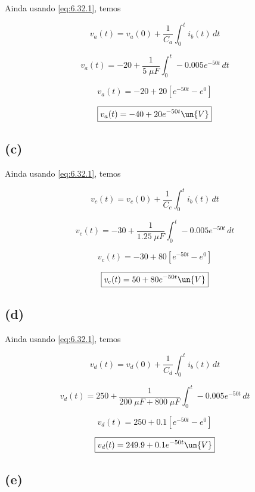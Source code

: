 Ainda usando \eqref{eq:6.32.1}, temos 

\[ v_a(t) = v_a(0) + \frac{1}{C_{a}} \int_{0}^{t} i_b(t) \,dt \]

\[ v_a(t) = -20 + \frac{1}{5 \;\mu F} \int_{0}^{t} -0.005e^{-50t} \,dt \]

\[ v_a(t) = -20 + 20 \left[e^{-50t} - e^0\right] \]

\[ \boxed{v_a(t) = -40 + 20e^{-50t} \un{V}}  \]

\subsection*{(c)}

Ainda usando \eqref{eq:6.32.1}, temos 

\[ v_c(t) = v_c(0) + \frac{1}{C_{c}} \int_{0}^{t} i_b(t) \,dt \]

\[ v_c(t) = -30 + \frac{1}{1.25 \;\mu F} \int_{0}^{t} -0.005e^{-50t} \,dt \]

\[ v_c(t) = -30 + 80 \left[e^{-50t} - e^0\right] \]

\[ \boxed{v_c(t) = 50 + 80e^{-50t} \un{V}}  \]

\subsection*{(d)}

Ainda usando \eqref{eq:6.32.1}, temos 

\[ v_d(t) = v_d(0) + \frac{1}{C_{d}} \int_{0}^{t} i_b(t) \,dt \]

\[ v_d(t) = 250 + \frac{1}{200 \;\mu F + 800 \;\mu F} \int_{0}^{t} -0.005e^{-50t} \,dt \]

\[ v_d(t) = 250 + 0.1 \left[e^{-50t} - e^0\right] \]

\[ \boxed{v_d(t) = 249.9 + 0.1e^{-50t} \un{V}}  \]

\subsection*{(e)}



